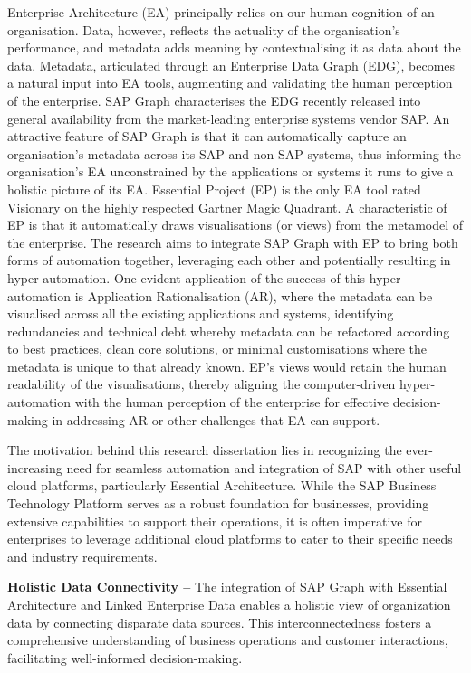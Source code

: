 \documentclass{article}
\begin{document}
Enterprise Architecture (EA) principally relies on our human cognition of an organisation. Data, however, reflects the actuality of the organisation’s performance, and metadata adds meaning by contextualising it as data about the data. Metadata, articulated through an Enterprise Data Graph (EDG), becomes a natural input into EA tools, augmenting and validating the human perception of the enterprise. SAP Graph characterises the EDG recently released into general availability from the market-leading enterprise systems vendor SAP. An attractive feature of SAP Graph is that it can automatically capture an organisation’s metadata across its SAP and non-SAP systems, thus informing the organisation’s EA unconstrained by the applications or systems it runs to give a holistic picture of its EA. Essential Project (EP) is the only EA tool rated Visionary on the highly respected Gartner Magic Quadrant. A characteristic of EP is that it automatically draws visualisations (or views) from the metamodel of the enterprise. The research aims to integrate SAP Graph with EP to bring both forms of automation together, leveraging each other and potentially resulting in hyper-automation. One evident application of the success of this hyper-automation is Application Rationalisation (AR), where the metadata can be visualised across all the existing applications and systems, identifying redundancies and technical debt whereby metadata can be refactored according to best practices, clean core solutions, or minimal customisations where the metadata is unique to that already known. EP’s views would retain the human readability of the visualisations, thereby aligning the computer-driven hyper-automation with the human perception of the enterprise for effective decision-making in addressing AR or other challenges that EA can support.

The motivation behind this research dissertation lies in recognizing the ever-increasing need for seamless automation and integration of SAP with other useful cloud platforms, particularly Essential Architecture. While the SAP Business Technology Platform serves as a robust foundation for businesses, providing extensive capabilities to support their operations, it is often imperative for enterprises to leverage additional cloud platforms to cater to their specific needs and industry requirements.

\textbf{Holistic Data Connectivity –} The integration of SAP Graph with Essential Architecture and Linked Enterprise Data enables a holistic view of organization data by connecting disparate data sources. This interconnectedness fosters a comprehensive understanding of business operations and customer interactions, facilitating well-informed decision-making.
\end{document}

